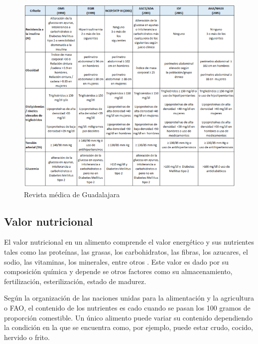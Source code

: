 \thinspace

\begin{figure}[h]
		\begin{center}
			\includegraphics[width=1\textwidth]{2/imagen2/oms.PNG}
	        \caption{Revista médica de Guadalajara }
			\label{fig24}
		\end{center}
		
	\end{figure}

\thinspace


\subsection{Valor nutricional}

El valor nutricional en un alimento comprende el valor energético y sus nutrientes tales como las proteínas, las grasas, los carbohidratos, las fibras, los azucares, el sodio, las vitaminas, los minerales, entre otros \parencite{nestle}. Este valor es dado por su composición química y depende se otros factores como su almacenamiento, fertilización, esterilización, estado de madurez. 

Según la organización de las naciones unidas para la alimentación y la agricultura o FAO, el contenido de los nutrientes es cado cuando se pasan los 100 gramos de proporción comestible. Un único alimento puede variar su contenido dependiendo la condición en la que se encuentra como, por ejemplo, puede estar crudo, cocido, hervido o frito.


